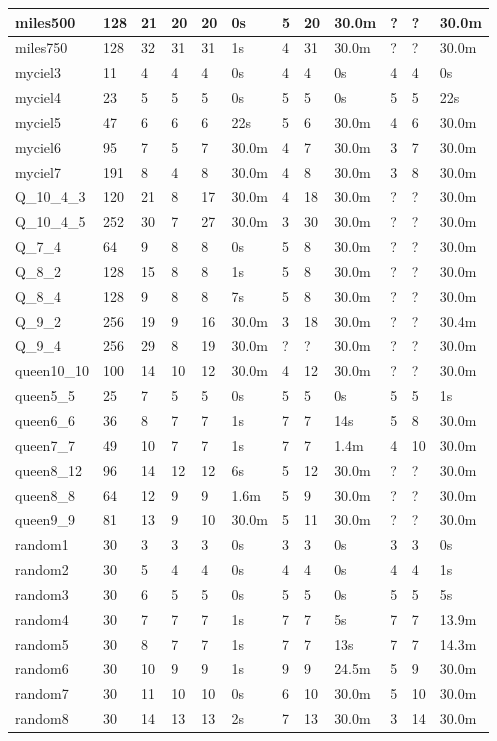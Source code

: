 \begin{longtable}{|lll|lll|lll|lll|}
\hline
miles500&128&21&20&20&0s&5&20&30.0m&?&?&30.0m\\
\hline
miles750&128&32&31&31&1s&4&31&30.0m&?&?&30.0m\\
\hline
myciel3&11&4&4&4&0s&4&4&0s&4&4&0s\\
\hline
myciel4&23&5&5&5&0s&5&5&0s&5&5&22s\\
\hline
myciel5&47&6&6&6&22s&5&6&30.0m&4&6&30.0m\\
\hline
myciel6&95&7&5&7&30.0m&4&7&30.0m&3&7&30.0m\\
\hline
myciel7&191&8&4&8&30.0m&4&8&30.0m&3&8&30.0m\\
\hline
Q\_10\_4\_3&120&21&8&17&30.0m&4&18&30.0m&?&?&30.0m\\
\hline
Q\_10\_4\_5&252&30&7&27&30.0m&3&30&30.0m&?&?&30.0m\\
\hline
Q\_7\_4&64&9&8&8&0s&5&8&30.0m&?&?&30.0m\\
\hline
Q\_8\_2&128&15&8&8&1s&5&8&30.0m&?&?&30.0m\\
\hline
Q\_8\_4&128&9&8&8&7s&5&8&30.0m&?&?&30.0m\\
\hline
Q\_9\_2&256&19&9&16&30.0m&3&18&30.0m&?&?&30.4m\\
\hline
Q\_9\_4&256&29&8&19&30.0m&?&?&30.0m&?&?&30.0m\\
\hline
queen10\_10&100&14&10&12&30.0m&4&12&30.0m&?&?&30.0m\\
\hline
queen5\_5&25&7&5&5&0s&5&5&0s&5&5&1s\\
\hline
queen6\_6&36&8&7&7&1s&7&7&14s&5&8&30.0m\\
\hline
queen7\_7&49&10&7&7&1s&7&7&1.4m&4&10&30.0m\\
\hline
queen8\_12&96&14&12&12&6s&5&12&30.0m&?&?&30.0m\\
\hline
queen8\_8&64&12&9&9&1.6m&5&9&30.0m&?&?&30.0m\\
\hline
queen9\_9&81&13&9&10&30.0m&5&11&30.0m&?&?&30.0m\\
\hline
random1&30&3&3&3&0s&3&3&0s&3&3&0s\\
\hline
random2&30&5&4&4&0s&4&4&0s&4&4&1s\\
\hline
random3&30&6&5&5&0s&5&5&0s&5&5&5s\\
\hline
random4&30&7&7&7&1s&7&7&5s&7&7&13.9m\\
\hline
random5&30&8&7&7&1s&7&7&13s&7&7&14.3m\\
\hline
random6&30&10&9&9&1s&9&9&24.5m&5&9&30.0m\\
\hline
random7&30&11&10&10&0s&6&10&30.0m&5&10&30.0m\\
\hline
random8&30&14&13&13&2s&7&13&30.0m&3&14&30.0m\\

\end{longtable}
